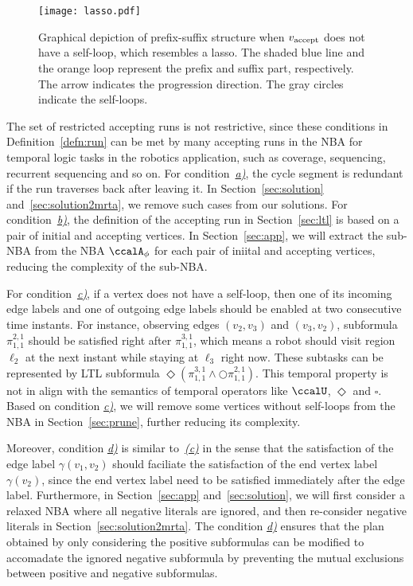\documentclass[Afour,sageh,times]{sagej}
\newcommand{\autop}{\ccalA_{\phi}}
\newcommand{\vertex}[1]{v_{\textup{#1}}}
\renewcommand{\ap}[3]{\mathcal{\pi}_{{#1},{#2}}^{#3}}
\begin{document}
\begin{figure}[t]
  \centering
  \texttt{[image: lasso.pdf]}
  \caption{Graphical depiction of prefix-suffix structure when $\vertex{accept}$ does not have a self-loop, which resembles a lasso. The shaded blue line and the orange loop represent the prefix and suffix part, respectively. The arrow indicates the progression direction. The gray circles indicate the self-loops.}
  \label{fig:lasso}
\end{figure}

The set of restricted accepting runs is not restrictive, since these  conditions in Definition~\ref{defn:run} can be met by many accepting runs in the NBA for temporal logic tasks in the robotics application, such as coverage, sequencing, recurrent sequencing and so on.
      For condition~\hyperref[cond:a]{\it a)}, the cycle segment is redundant if the run traverses back after leaving it. In Section~\ref{sec:solution} and~\ref{sec:solution2mrta}, we remove such cases from our solutions.
      For condition~\hyperref[cond:b]{\it b)}, the definition of the accepting run in Section~\ref{sec:ltl} is based on a pair of initial and accepting vertices. In Section~\ref{sec:app}, we will extract the sub-NBA from the NBA $\autop$ for each pair of iniital and accepting vertices, reducing the complexity of the sub-NBA.

      For condition~\hyperref[cond:c]{\it c)}, if a vertex does not have a self-loop, then one of its incoming edge labels  and one of outgoing edge labels  should be enabled at two consecutive time instants. For instance, observing edges $(v_2, v_3)$ and $(v_3, v_2)$, subformula $\ap{1}{1}{2,1}$ should be satisfied right after $\ap{1}{1}{3,1}$, which means a robot  should visit region $\ell_2$ at the next instant while staying at $\ell_3$ right now. These subtasks can be represented by LTL subformula $\Diamond(\ap{1}{1}{3,1} \wedge  \bigcirc \ap{1}{1}{2,1})$. This temporal property is not in align with the semantics of temporal operators like $\ccalU$, $\Diamond$ and $\square$. Based on condition \hyperref[cond:c]{\it c)}, we will remove some vertices without self-loops from the NBA in Section~\ref{sec:prune}, further reducing its complexity.

      Moreover, condition \hyperref[cond:d]{\it d)} is similar to~\hyperref[cond:c]{\it (c)} in the sense that  the satisfaction of the edge label $\gamma(v_1, v_2)$ should faciliate the satisfaction of the end vertex label $\gamma(v_2)$, since the end vertex label need to be satisfied immediately after the edge label. Furthermore, in Section~\ref{sec:app} and~\ref{sec:solution}, we will first consider a relaxed NBA where all negative literals are ignored, and then re-consider negative literals in Section~\ref{sec:solution2mrta}. The condition \hyperref[cond:d]{\it d)} ensures that the plan obtained by only considering the positive subformulas can be modified to accomadate the ignored negative subformula by preventing the mutual exclusions between positive and negative subformulas.
\end{document}
